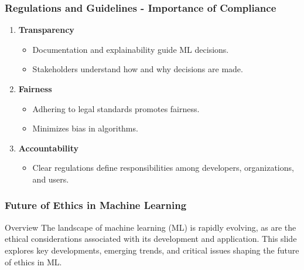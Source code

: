 \documentclass[aspectratio=169]{beamer}
\begin{document}
\begin{frame}[fragile]
    \frametitle{Regulations and Guidelines - Importance of Compliance}
    \begin{enumerate}
        \item \textbf{Transparency}
        \begin{itemize}
            \item Documentation and explainability guide ML decisions.
            \item Stakeholders understand how and why decisions are made.
        \end{itemize}

        \item \textbf{Fairness}
        \begin{itemize}
            \item Adhering to legal standards promotes fairness.
            \item Minimizes bias in algorithms.
        \end{itemize}

        \item \textbf{Accountability}
        \begin{itemize}
            \item Clear regulations define responsibilities among developers, organizations, and users.
        \end{itemize}
    \end{enumerate}
\end{frame}

\begin{frame}[fragile]
    \frametitle{Future of Ethics in Machine Learning}
    \begin{block}{Overview}
        The landscape of machine learning (ML) is rapidly evolving, as are the ethical considerations associated with its development and application. This slide explores key developments, emerging trends, and critical issues shaping the future of ethics in ML.
    \end{block}
\end{frame}
\end{document}
